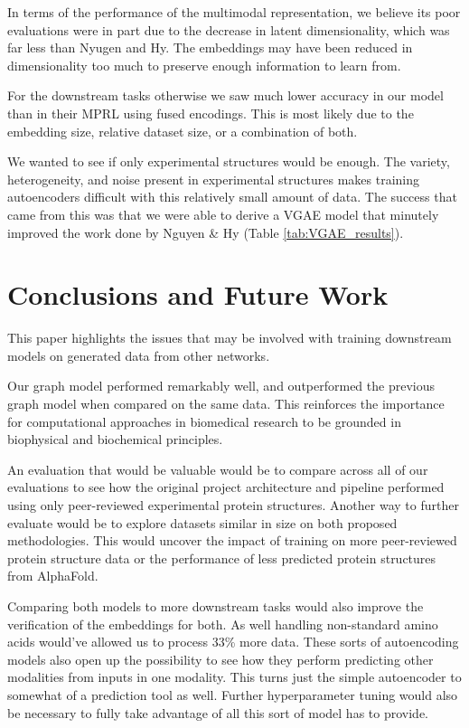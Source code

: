 \documentclass{article}
\begin{document}
In terms of the performance of the multimodal representation, we believe its poor evaluations were in part due to the decrease in latent dimensionality, which was far less than Nyugen and Hy. The embeddings may have been reduced in dimensionality too much to preserve enough information to learn from.

For the downstream tasks otherwise we saw much lower accuracy in our model than in their MPRL using fused encodings. This is most likely due to the embedding size, relative dataset size, or a combination of both.

We wanted to see if only experimental structures would be enough. The variety, heterogeneity, and noise present in experimental structures makes training autoencoders difficult with this relatively small amount of data. The success that came from this was that we were able to derive a VGAE model that minutely improved the work done by Nguyen \& Hy (Table \ref{tab:VGAE_results}).

\section{Conclusions and Future Work}
This paper highlights the issues that may be involved with training downstream models on generated data from other networks.

Our graph model performed remarkably well, and outperformed the previous graph model when compared on the same data. This reinforces the importance for computational approaches in biomedical research to be grounded in biophysical and biochemical principles. 

An evaluation that would be valuable would be to compare across all of our evaluations to see how the original project architecture and pipeline performed using only peer-reviewed experimental protein structures. Another way to further evaluate would be to explore datasets similar in size on both proposed methodologies. This would uncover the impact of training on more peer-reviewed protein structure data or the performance of less predicted protein structures from AlphaFold. 

Comparing both models to more downstream tasks would also improve the verification of the embeddings for both. As well handling non-standard amino acids would've allowed us to process 33\% more data. These sorts of autoencoding models also open up the possibility to see how they perform predicting other modalities from inputs in one modality. This turns just the simple autoencoder to somewhat of a prediction tool as well. Further hyperparameter tuning would also be necessary to fully take advantage of all this sort of model has to provide.
\end{document}
